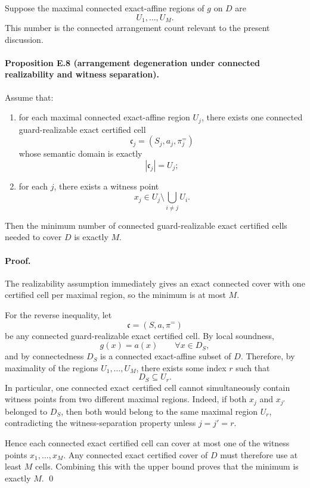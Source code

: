 Suppose the maximal connected exact-affine regions of $g$ on $D$ are
\[
U_1,\dots,U_M.
\]
This number is the connected arrangement count relevant to the present discussion.

\paragraph{Proposition E.8 (arrangement degeneration under connected realizability and witness separation).}
Assume that:
\begin{enumerate}
    \item for each maximal connected exact-affine region $U_j$, there exists one connected guard-realizable exact certified cell
    \[
    \mathfrak c_j=(S_j,a_j,\pi_j^{=})
    \]
    whose semantic domain is exactly
    \[
    |\mathfrak c_j|=U_j;
    \]
    \item for each $j$, there exists a witness point
    \[
    x_j\in U_j\setminus \bigcup_{i\neq j}U_i.
    \]
\end{enumerate}
Then the minimum number of connected guard-realizable exact certified cells needed to cover $D$ is exactly $M$.

\paragraph{Proof.}
The realizability assumption immediately gives an exact connected cover with one certified cell per maximal region, so the minimum is at most $M$.

For the reverse inequality, let
\[
\mathfrak c=(S,a,\pi^{=})
\]
be any connected guard-realizable exact certified cell. By local soundness,
\[
g(x)=a(x)
\qquad \forall x\in D_S,
\]
and by connectedness $D_S$ is a connected exact-affine subset of $D$. Therefore, by maximality of the regions $U_1,\dots,U_M$, there exists some index $r$ such that
\[
D_S\subseteq U_r.
\]
In particular, one connected exact certified cell cannot simultaneously contain witness points from two different maximal regions. Indeed, if both $x_j$ and $x_{j'}$ belonged to $D_S$, then both would belong to the same maximal region $U_r$, contradicting the witness-separation property unless $j=j'=r$.

Hence each connected exact certified cell can cover at most one of the witness points $x_1,\dots,x_M$. Any connected exact certified cover of $D$ must therefore use at least $M$ cells. Combining this with the upper bound proves that the minimum is exactly $M$. \qed

